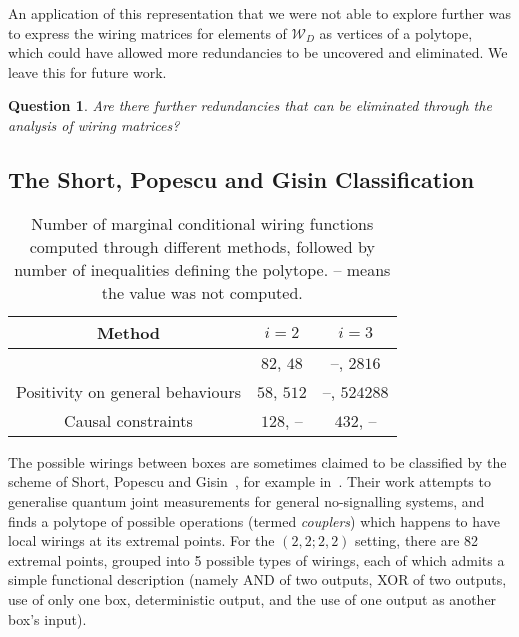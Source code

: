 \documentclass[10pt, a4paper]{article}
\numberwithin{equation}{section} %
\theoremstyle{definition}
\theoremstyle{plain}
\newtheorem{question}{Question}
\newenvironment{Tabular}[1] %
{\def\arraystretch{1.75}\begin{tabular}{#1}}
{\end{tabular}}
\newcommand{\?}{\mathrel{?}} %
\newcommand{\sW}{\mathcal{W}}
\begin{document}
                  An application of this representation that we were not able to explore further was to express the wiring matrices for elements of \(\sW_D\) as vertices of a polytope, which could have allowed more redundancies to be uncovered and eliminated. We leave this for future work.
                  \begin{question}
                    Are there further redundancies that can be eliminated through the analysis of wiring matrices?
                  \end{question}

                  \subsection{The Short, Popescu and Gisin Classification}\label{sec:locwir_SPG}

              \begin{table}
                  \centering
                      \begin{Tabular}{ccc} 
                        \toprule
                        Method & \(i = 2\) & \(i = 3\) \\
                        \midrule
                        \cite{ShortEntangleSwap} & \(82\), \(48\)  & --, \(2816\) \\
                        Positivity on general behaviours & \(58\), \(512\) & --, \(524288\) \\
                        Causal constraints & \(128\), -- & \(432\), -- \\
                        \bottomrule
                      \end{Tabular}
                      \caption{Number of marginal conditional wiring functions computed through different methods, followed by number of inequalities defining the polytope. -- means the value was not computed.}\label{tab:polys}
              \end{table}

                  The possible wirings between boxes are sometimes claimed to be classified by the scheme of Short, Popescu and Gisin~\cite{ShortEntangleSwap}, for example in~\cite{ShortClassClaim}. Their work attempts to generalise quantum joint measurements for general no-signalling systems, and finds a polytope of possible operations (termed \emph{couplers}) which happens to have local wirings at its extremal points. For the  \((2,2;2,2)\) setting, there are 82 extremal points, grouped into 5 possible types of wirings, each of which admits a simple functional description (namely AND of two outputs, XOR of two outputs, use of only one box, deterministic output, and the use of one output as another box's input).
\end{document}
